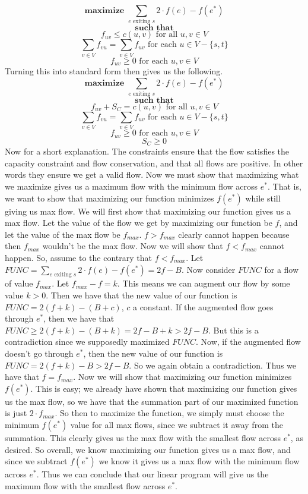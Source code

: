 \documentclass{article}
\begin{document}
\begin{description}
        \[ \textbf{maximize } \sum_{e \text{ exiting $s$}} 2 \cdot
        f(e) - f(e^*) \] \[ \textbf{such that} \]
        \[ f_{uv} \leq c(u,v) \text{ for all $u,v \in V$} \]
        \[ \sum_{v \in V} f_{vu} = \sum_{v \in V} f_{uv} \text{ for each $u \in
        V - \{s,t\}$} \]
        \[ f_{uv} \ge 0 \text{ for each $u,v \in V$} \]
        Turning this into standard form then gives us the following.
        \[ \textbf{maximize } \sum_{e \text{ exiting $s$}} 2 \cdot
        f(e) - f(e^*) \] \[ \textbf{such that} \]
        \[ f_{uv} + S_C = c(u,v) \text{ for all $u,v \in V$} \]
        \[ \sum_{v \in V} f_{vu} = \sum_{v \in V} f_{uv} \text{ for each $u \in
        V - \{s,t\}$} \]
        \[ f_{uv} \ge 0 \text{ for each $u,v \in V$} \]
        \[ S_C \ge 0 \]
        Now for a short explanation. The constraints ensure that the
        flow satisfies the capacity constraint and flow conservation, and that
        all flows are positive. In other
        words they ensure we get a valid flow. Now we must show that maximizing
        what we maximize gives us a maximum flow with the minimum flow across
        $e^*$. That is, we want to show that maximizing our function
        minimizes $f(e^*)$ while still giving us max flow.
        We will first show that maximizing our
        function gives us a max flow. Let the value of the flow we get by
        maximizing our function be $f$, and let the value of the max flow be
        $f_{max}$. $f > f_{max}$ clearly cannot happen because then $f_{max}$ wouldn't be the
        max flow. Now we will show that $f < f_{max}$ cannot happen. So, assume
        to the contrary that $f < f_{max}$. Let $FUNC =  \sum_{e \text{ exiting
        $s$}} 2 \cdot
        f(e) - f(e^*) = 2f - B$. Now consider $FUNC$ for a flow of value $f_{max}$.
        Let $f_{max} - f = k$. This means we can augment our flow
        by some value $k > 0$. Then we have that the new value of
        our function is $FUNC = 2(f + k) - (B+c)$, $c$ a constant. If the
        augmented flow goes through
        $e^*$, then we have that $FUNC \geq 2(f+k) - (B+k) = 2f - B + k > 2f - B$.
        But this is a contradiction since we supposedly maximized $FUNC$. Now,
        if the augmented flow doesn't go through $e^*$, then the new value of
        our function is $FUNC = 2(f+k) - B > 2f - B$. So we again obtain a
        contradiction. Thus we have that $f = f_{max}$. Now we will show that
        maximizing our function minimizes $f(e^*)$. This is easy; we already
        have shown that maximizing our function gives us the max flow, so we
        have that the summation part of our maximized function is just $2 \cdot f_{max}$.
        So then to maximize the function, we simply must choose the minimum
        $f(e^*)$ value for all max flows,
        since we subtract it away from the summation. This clearly gives us the
        max flow with the smallest flow across $e^*$, as desired. So overall, we
        know maximizing our function gives us a max flow, and since we subtract
        $f(e^*)$ we know it gives us a max flow with the minimum flow across
        $e^*$.
        Thus we can conclude that
        our linear program will give us the maximum flow with the smallest flow
        across $e^*$.
\end{description}
\end{document}
